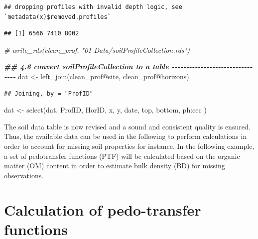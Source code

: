 \documentclass[
  10pt,
  b5paper,
  oneside]{book}
\newenvironment{Shaded}{\begin{snugshade}}{\end{snugshade}}
\newcommand{\CommentTok}[1]{\textcolor[rgb]{0.56,0.35,0.01}{\textit{#1}}}
\newcommand{\DocumentationTok}[1]{\textcolor[rgb]{0.56,0.35,0.01}{\textbf{\textit{#1}}}}
\newcommand{\FunctionTok}[1]{\textcolor[rgb]{0.00,0.00,0.00}{#1}}
\newcommand{\NormalTok}[1]{#1}
\newcommand{\OtherTok}[1]{\textcolor[rgb]{0.56,0.35,0.01}{#1}}
\newcommand{\SpecialCharTok}[1]{\textcolor[rgb]{0.00,0.00,0.00}{#1}}
\begin{document}
\begin{verbatim}
## dropping profiles with invalid depth logic, see `metadata(x)$removed.profiles`
\end{verbatim}

\begin{Shaded}
\end{Shaded}

\begin{verbatim}
## [1] 6566 7410 8002
\end{verbatim}

\begin{Shaded}
\begin{Highlighting}[]
\CommentTok{\# write\_rds(clean\_prof, "01{-}Data/soilProfileCollection.rds")}

\DocumentationTok{\#\# 4.6 convert soilProfileCollection to a table {-}{-}{-}{-}{-}{-}{-}{-}{-}{-}{-}{-}{-}{-}{-}{-}{-}{-}{-}{-}{-}{-}{-}{-}{-}{-}{-}{-}{-}{-}{-}{-}}
\NormalTok{dat }\OtherTok{\textless{}{-}} \FunctionTok{left\_join}\NormalTok{(clean\_prof}\SpecialCharTok{@}\NormalTok{site, clean\_prof}\SpecialCharTok{@}\NormalTok{horizons)}
\end{Highlighting}
\end{Shaded}

\begin{verbatim}
## Joining, by = "ProfID"
\end{verbatim}

\begin{Shaded}
\begin{Highlighting}[]
\NormalTok{dat }\OtherTok{\textless{}{-}} \FunctionTok{select}\NormalTok{(dat, ProfID, HorID, x, y, date, top, bottom, ph}\SpecialCharTok{:}\NormalTok{cec )}
\end{Highlighting}
\end{Shaded}

The soil data table is now revised and a sound and consistent quality is ensured. Thus, the available data can be used in the following to perform calculations in order to account for missing soil properties for instance. In the following example, a set of pedotransfer functions (PTF) will be calculated based on the organic matter (OM) content in order to estimate bulk density (BD) for missing observations.

\hypertarget{calculation-of-pedo-transfer-functions}{%
\section{Calculation of pedo-transfer functions}\label{calculation-of-pedo-transfer-functions}}
\end{document}
